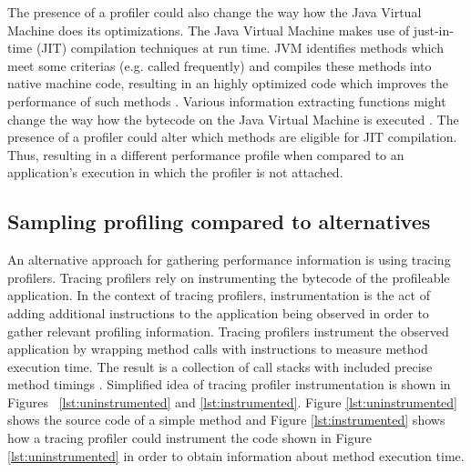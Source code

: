 \documentclass[..thesis.tex]{subfiles}
\begin{document}

The presence of a profiler could also change the way how the Java Virtual Machine does its optimizations. The Java Virtual Machine makes use of just-in-time (JIT) compilation techniques at run time. JVM identifies methods which meet some criterias (e.g. called frequently) and compiles these methods into native machine code, resulting in an highly optimized code which improves the performance of such methods \cite{understanding_jit}. Various information extracting functions might change the way how the bytecode on the Java Virtual Machine is executed \cite{mytkowicz_evaluating_2010}. The presence of a profiler could alter which methods are eligible for JIT compilation. Thus, resulting in a different performance profile when compared to an application's execution in which the profiler is not attached.


\subsection{Sampling profiling compared to alternatives}

An alternative approach for gathering performance information is using tracing profilers. Tracing profilers rely on instrumenting the bytecode of the profileable application. In the context of tracing profilers, instrumentation is the act of adding additional instructions to the application being observed in order to gather relevant profiling information. Tracing profilers instrument the observed application by wrapping method calls with instructions to measure method execution time. The result is a collection of call stacks with included precise method timings \cite{whitham_jack}. Simplified idea of tracing profiler instrumentation is shown in Figures ~\ref{lst:uninstrumented} and \ref{lst:instrumented}. Figure \ref{lst:uninstrumented} shows the source code of a simple method and Figure \ref{lst:instrumented} shows how a tracing profiler could instrument the code shown in Figure \ref{lst:uninstrumented} in order to obtain information about method execution time.
\end{document}
